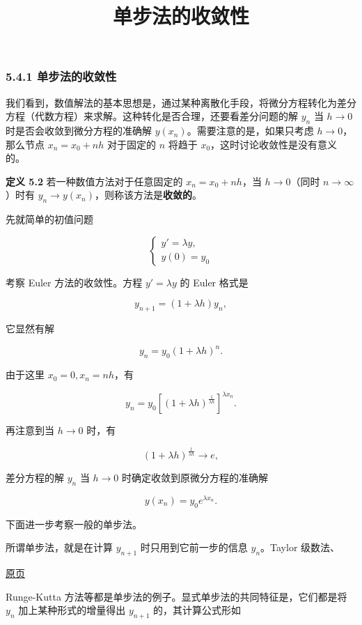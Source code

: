 \documentclass[
  10pt,
  fontset=fandol]{ctexart}
\title{单步法的收敛性}
\author{}
\date{}
\begin{document}
\maketitle

\subsubsection{5.4.1 单步法的收敛性}\label{ux5355ux6b65ux6cd5ux7684ux6536ux655bux6027}

我们看到，数值解法的基本思想是，通过某种离散化手段，将微分方程转化为差分方程（代数方程）来求解。这种转化是否合理，还要看差分问题的解 \(y_n\) 当 \(h\to0\) 时是否会收敛到微分方程的准确解 \(y(x_n)\)。需要注意的是，如果只考虑 \(h\to0\)，那么节点 \(x_n=x_0+nh\) 对于固定的 \(n\) 将趋于 \(x_0\)，这时讨论收敛性是没有意义的。

\textbf{定义 5.2} 若一种数值方法对于任意固定的 \(x_n=x_0+nh\)，当 \(h\to0\)（同时 \(n\to\infty\)）时有 \(y_n\to y(x_n)\)，则称该方法是\textbf{收敛的}。

先就简单的初值问题

\[
\begin{cases}
y'=\lambda y,\\
y(0)=y_0
\end{cases}\tag{5.4.1}
\]

考察 Euler 方法的收敛性。方程 \(y'=\lambda y\) 的 Euler 格式是

\[
y_{n+1}=(1+\lambda h)y_n,\tag{5.4.2}
\]

它显然有解

\[
y_n=y_0(1+\lambda h)^n.
\]

由于这里 \(x_0=0,x_n=nh\)，有

\[
y_n=y_0\left[(1+\lambda h)^{\frac{1}{\lambda h}}\right]^{\lambda x_n}.
\]

再注意到当 \(h\to0\) 时，有

\[
(1+\lambda h)^{\frac{1}{\lambda h}}\to e,
\]

差分方程的解 \(y_n\) 当 \(h\to0\) 时确定收敛到原微分方程的准确解

\[
y(x_n)=y_0e^{\lambda x_n}.
\]

下面进一步考察一般的单步法。

所谓单步法，就是在计算 \(y_{n+1}\) 时只用到它前一步的信息 \(y_n\)。Taylor 级数法、

\href{../../source-images/pdf-134.jpeg}{原页}

Runge-Kutta 方法等都是单步法的例子。显式单步法的共同特征是，它们都是将 \(y_n\) 加上某种形式的增量得出 \(y_{n+1}\) 的，其计算公式形如
\end{document}
